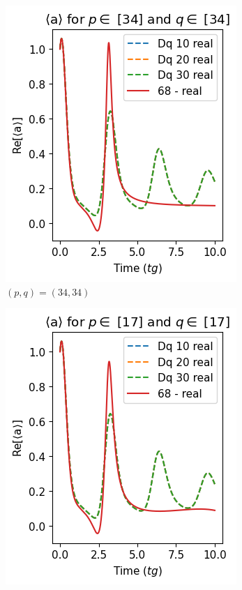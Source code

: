 \begin{figure}[h!]
\begin{subfigure}{0.32\linewidth}
        \includegraphics[width=\linewidth]{Pics/Pade_34_34.pdf}
        \caption{$(p, q) = (34, 34)$}
        \label{fig:Pade_34_34}
    \end{subfigure}
    \hfill
    \begin{subfigure}{0.32\linewidth}
        \centering
        \includegraphics[width=\linewidth]{Pics/Pade_17_17.pdf}

\end{subfigure}
\end{figure}
